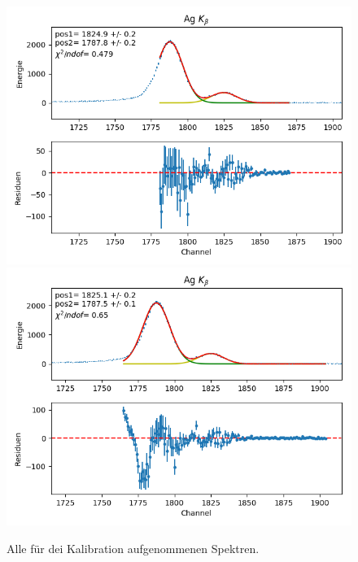 \documentclass[12pt,a4paper]{article}
\begin{document}
\begin{figure}[H]
\centering
\includegraphics[scale=0.8]{Bilder/alpha/ag_beta_1.png}
\includegraphics[scale=0.8]{Bilder/alpha/ag_beta_2.png}
\caption{Alle für dei Kalibration aufgenommenen Spektren.}
\label{fig:kal_alles}
\end{figure}
\end{document}
